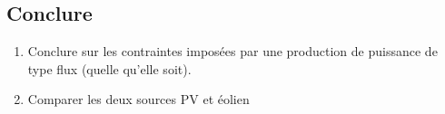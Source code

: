 \documentclass[12pt,a4,french]{article}
\begin{document}
\subsection{Conclure}
\begin{enumerate}
	\item Conclure sur les contraintes imposées par une production de puissance de type flux (quelle qu'elle soit). 
	
	\item Comparer les deux  sources PV et éolien
\end{enumerate}
\end{document}
